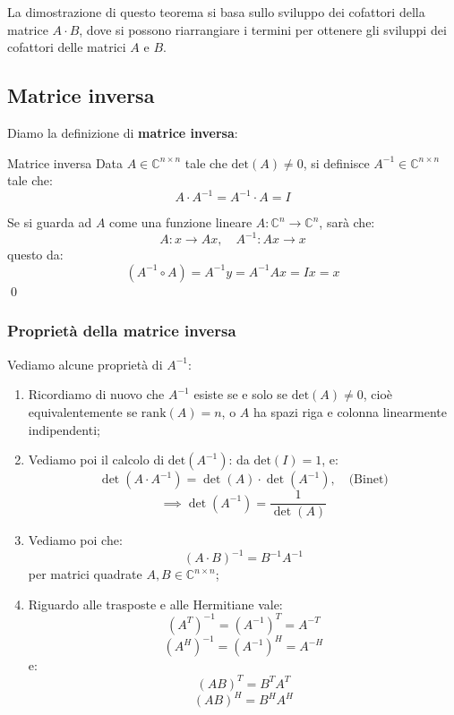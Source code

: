 \documentclass[a4paper,11pt]{article}
\begin{document}
La dimostrazione di questo teorema si basa sullo sviluppo dei cofattori della matrice $A \cdot B$, dove si possono riarrangiare i termini per ottenere gli sviluppi dei cofattori delle matrici $A$ e $B$.

\subsection{Matrice inversa}
Diamo la definizione di \textbf{matrice inversa}:
\begin{definition}{Matrice inversa}
	Data $A \in \mathbb{C}^{n \times n}$ tale che $\mathrm{det}(A) \neq 0$, si definisce $A^{-1} \in \mathbb{C}^{n \times n}$ tale che:
	$$
	A \cdot A^{-1} = A^{-1} \cdot A = I
	$$
\end{definition}
Se si guarda ad $A$ come una funzione lineare $A : \mathbb{C}^n \rightarrow \mathbb{C}^n$, sarà che:
$$
A : x \rightarrow Ax, \quad A^{-1} : Ax \rightarrow x
$$
questo da:
$$
\left(A^{-1} \circ A\right) = A^{-1} y = A^{-1} A x = Ix = x
$$
\qed

\subsubsection{Proprietà della matrice inversa}
Vediamo alcune proprietà di $A^{-1}$:
\begin{enumerate}
	\item Ricordiamo di nuovo che $A^{-1}$ esiste se e solo se $\mathrm{det}(A) \neq 0$, cioè equivalentemente se $\mathrm{rank}(A) = n$, o $A$ ha spazi riga e colonna linearmente indipendenti;

		\item
Vediamo poi il calcolo di $\mathrm{det}(A^{-1})$: da $\mathrm{det}(I) = 1$, e:
$$
\det(A \cdot A^{-1}) = \det(A) \cdot \det(A^{-1}), \quad \text{(Binet)}
$$
$$
\implies \det(A^{-1}) = \frac{1}{\det(A)}
$$

\item Vediamo poi che:
$$
(A \cdot B)^{-1} = B^{-1} A^{-1}
$$
per matrici quadrate $A, B \in \mathbb{C}^{n \times n}$;

\item Riguardo alle trasposte e alle Hermitiane vale:
	$$
		(A^T)^{-1} = (A^{-1})^T = A^{-T}
	$$
	$$
		(A^H)^{-1} = (A^{-1})^H = A^{-H}
	$$
	e:
	$$
	(AB)^T = B^T A^T
	$$
	$$
	(AB)^H = B^H A^H
	$$
\end{enumerate}
\end{document}
